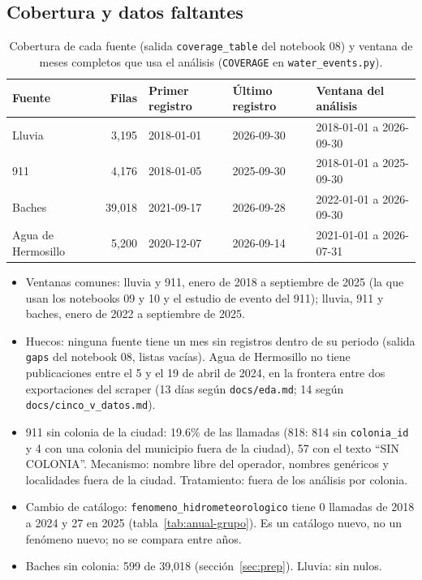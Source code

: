 \documentclass[11pt]{article}
\newcommand{\cod}[1]{\nolinkurl{#1}}
\begin{document}
\subsection{Cobertura y datos faltantes}
\label{sec:cobertura}

\begin{table}[!htbp]
  \centering
  \small
  \caption{Cobertura de cada fuente (salida \cod{coverage_table} del notebook 08) y ventana de meses completos que usa el análisis (\cod{COVERAGE} en \cod{water_events.py}).}
  \label{tab:cobertura}
  \begin{tabular}{lrlll}
    \toprule
    Fuente & Filas & Primer registro & Último registro & Ventana del análisis \\
    \midrule
    Lluvia & 3,195 & 2018-01-01 & 2026-09-30 & 2018-01-01 a 2026-09-30 \\
    911 & 4,176 & 2018-01-05 & 2025-09-30 & 2018-01-01 a 2025-09-30 \\
    Baches & 39,018 & 2021-09-17 & 2026-09-28 & 2022-01-01 a 2026-09-30 \\
    Agua de Hermosillo & 5,200 & 2020-12-07 & 2026-09-14 & 2021-01-01 a 2026-07-31 \\
    \bottomrule
  \end{tabular}
\end{table}

\begin{itemize}
  \item Ventanas comunes: lluvia y 911, enero de 2018 a septiembre de 2025 (la que usan los notebooks 09 y 10 y el estudio de evento del 911); lluvia, 911 y baches, enero de 2022 a septiembre de 2025.
  \item Huecos: ninguna fuente tiene un mes sin registros dentro de su periodo (salida \cod{gaps} del notebook 08, listas vacías). Agua de Hermosillo no tiene publicaciones entre el 5 y el 19 de abril de 2024, en la frontera entre dos exportaciones del scraper (13 días según \cod{docs/eda.md}; 14 según \cod{docs/cinco_v_datos.md}).
  \item 911 sin colonia de la ciudad: 19.6\% de las llamadas (818: 814 sin \cod{colonia_id} y 4 con una colonia del municipio fuera de la ciudad), 57 con el texto ``SIN COLONIA''. Mecanismo: nombre libre del operador, nombres genéricos y localidades fuera de la ciudad. Tratamiento: fuera de los análisis por colonia.
  \item Cambio de catálogo: \cod{fenomeno_hidrometeorologico} tiene 0 llamadas de 2018 a 2024 y 27 en 2025 (tabla~\ref{tab:anual-grupo}). Es un catálogo nuevo, no un fenómeno nuevo; no se compara entre años.
  \item Baches sin colonia: 599 de 39,018 (sección~\ref{sec:prep}). Lluvia: sin nulos.
\end{itemize}
\end{document}
